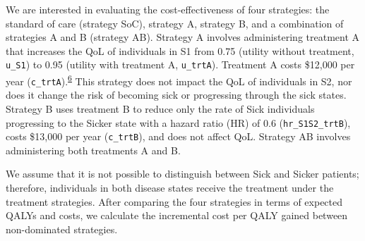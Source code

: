 \documentclass[
]{article}
\begin{document}
We are interested in evaluating the cost-effectiveness of four strategies: the standard of care (strategy SoC), strategy A, strategy B, and a combination of strategies A and B (strategy AB). Strategy A involves administering treatment A that increases the QoL of individuals in S1 from 0.75 (utility without treatment, \texttt{u\_S1}) to 0.95 (utility with treatment A, \texttt{u\_trtA}). Treatment A costs \$12,000 per year (\texttt{c\_trtA}).\textsuperscript{\protect\hyperlink{ref-Krijkamp2018}{6}} This strategy does not impact the QoL of individuals in S2, nor does it change the risk of becoming sick or progressing through the sick states. Strategy B uses treatment B to reduce only the rate of Sick individuals progressing to the Sicker state with a hazard ratio (HR) of 0.6 (\texttt{hr\_S1S2\_trtB}), costs \$13,000 per year (\texttt{c\_trtB}), and does not affect QoL. Strategy AB involves administering both treatments A and B.

We assume that it is not possible to distinguish between Sick and Sicker patients; therefore, individuals in both disease states receive the treatment under the treatment strategies. After comparing the four strategies in terms of expected QALYs and costs, we calculate the incremental cost per QALY gained between non-dominated strategies.
\end{document}
